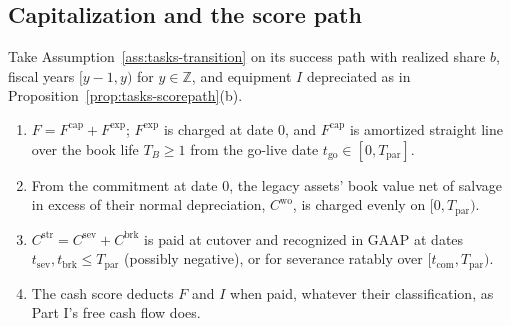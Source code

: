 \subsection{Capitalization and the score path}\label{sec:acct-path}

\begin{assumption}\label{ass:acct-books}
Take Assumption~\ref{ass:tasks-transition} on its success path with realized share $b$, fiscal years $[y-1,y)$ for $y\in\mathbb Z$, and equipment $I$ depreciated as in Proposition~\ref{prop:tasks-scorepath}(b).
\begin{enumerate}
\item[(i)] $F=F^{\mathrm{cap}}+F^{\mathrm{exp}}$; $F^{\mathrm{exp}}$ is charged at date 0, and $F^{\mathrm{cap}}$ is amortized straight line over the book life $T_B\ge 1$ from the go-live date $t_{\mathrm{go}}\in[0,T_{\mathrm{par}}]$.
\item[(ii)] From the commitment at date 0, the legacy assets' book value net of salvage in excess of their normal depreciation, $C^{\mathrm{wo}}$, is charged evenly on $[0,T_{\mathrm{par}})$.
\item[(iii)] $C^{\mathrm{str}}=C^{\mathrm{sev}}+C^{\mathrm{brk}}$ is paid at cutover and recognized in GAAP at dates $t_{\mathrm{sev}},t_{\mathrm{brk}}\le T_{\mathrm{par}}$ (possibly negative), or for severance ratably over $[t_{\mathrm{com}},T_{\mathrm{par}})$.
\item[(iv)] The cash score deducts $F$ and $I$ when paid, whatever their classification, as Part I's free cash flow does.
\end{enumerate}
\end{assumption}

